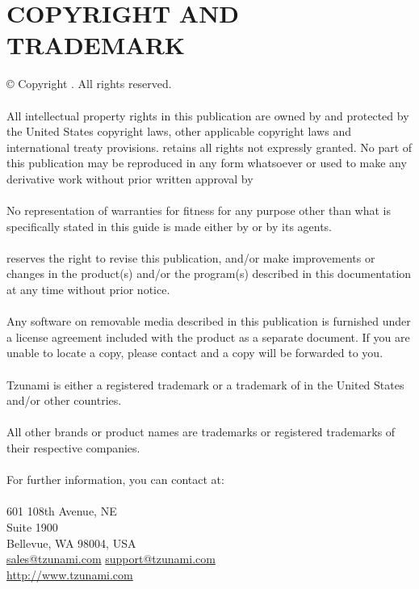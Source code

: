 \chapter{COPYRIGHT AND TRADEMARK}
© Copyright \the\year{}. \compName All rights reserved.\\ \\
All intellectual property rights in this publication are owned by \compName and protected by the United States copyright laws, other applicable copyright laws and international treaty provisions. \compName retains all rights not expressly granted. No part of this publication may be reproduced in any form whatsoever or used to make any derivative work without prior written approval by \compName
\\ \\
No representation of warranties for fitness for any purpose other than what is specifically stated in this guide is made either by \compName or by its agents.
\\ \\
\compName reserves the right to revise this publication, and/or make improvements or changes in the product(s) and/or the program(s) described in this documentation at any time without prior notice.
\\ \\
Any software on removable media described in this publication is furnished under a license agreement included with the product as a separate document. If you are unable to locate a copy, please contact \compName and a copy will be forwarded to you.
\\ \\
Tzunami is either a registered trademark or a trademark of \compName in the United States and/or other countries.
\\\\
All other brands or product names are trademarks or registered trademarks of their respective companies.
\\ \\
For further information, you can contact \compName at: 
\\
\compName \\
601 108th Avenue, NE \\
Suite 1900\\
Bellevue, WA 98004, USA\\
\href{mailto: sales@tzunami.com}{sales@tzunami.com}
\href{mailto: support@tzunami.com}{support@tzunami.com}\\
\url{http://www.tzunami.com}